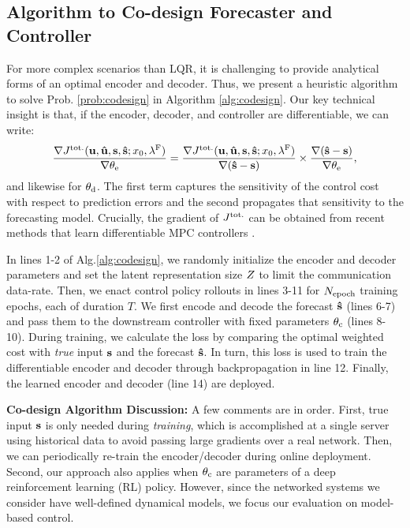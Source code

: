 \subsection{Algorithm to Co-design Forecaster and Controller}
\label{subsec:alg_codesign}
For more complex scenarios than LQR, it is challenging to provide analytical forms of an optimal encoder and decoder. Thus, we present a heuristic algorithm to solve Prob. \ref{prob:codesign} in Algorithm \ref{alg:codesign}. 
Our key technical insight is that, if the encoder, decoder, and controller are differentiable, we can write:
\begin{align}
    \frac{\nabla J^{\mathrm{tot.}}(\bold{u}, \bold{\hat{u}}, \bold{s}, \bold{\hat{s}}; x_0, \lambda^{\mathrm{F}})}{\nabla \theta_{\mathrm{e}}} = \frac{\nabla J^{\mathrm{tot.}}(\bold{u}, \bold{\hat{u}}, \bold{s}, \bold{\hat{s}}; x_0, \lambda^{\mathrm{F}})}{\nabla (\bold{\hat{s}} - \bold{s})} \times \frac{\nabla (\bold{\hat{s}}- \bold{s})}{\nabla \theta_{\mathrm{e}}},
\end{align}
and likewise for $\theta_{\mathrm{d}}$. The first term captures the sensitivity of the control cost with respect to prediction errors and the second propagates that sensitivity to the forecasting model.
Crucially, the gradient of $J^{\mathrm{tot.}}$ can be obtained from recent methods that learn differentiable MPC controllers \cite{agrawal2020learningcontrol,amos2018differentiable}. 

% 

In lines 1-2 of Alg.\ref{alg:codesign}, we randomly initialize the encoder and decoder parameters and set the latent representation size $Z$ to limit the communication data-rate. Then, we enact control policy rollouts in lines 3-11 for $N_{\text{epoch}}$ training epochs, each of duration $T$. We first encode and decode the forecast $\bold{\hat{s}}$ (lines 6-7) and pass them to the downstream controller with fixed parameters $\theta_{\mathrm{c}}$ (lines 8-10). During training, we calculate the loss by comparing the optimal weighted cost with \textit{true} input $\bold{s}$ and the forecast $\bold{\hat{s}}$. In turn, this loss is used to train the differentiable encoder and decoder through backpropagation in line 12. Finally, the learned encoder and decoder (line 14) are deployed.

\textbf{Co-design Algorithm Discussion: }
A few comments are in order. First, true input $\bold{s}$ is only needed during \textit{training}, which is accomplished at a single server using historical data to avoid passing large gradients over a real network. Then, we can periodically re-train the encoder/decoder during online deployment.
Second, our approach also applies when $\theta_{\mathrm{c}}$ are parameters of a deep reinforcement learning (RL) policy. 
However, since the networked systems we consider have well-defined dynamical models, we focus our evaluation on model-based control. 

